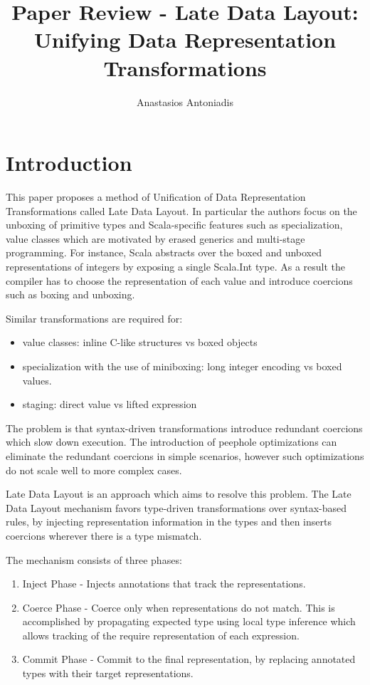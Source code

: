 \documentclass{article} \usepackage{hyperref} \usepackage{graphicx}
\begin{document}
\title{Paper Review - Late Data Layout: Unifying Data Representation Transformations} \author{Anastasios Antoniadis}

\maketitle

\section{Introduction}

This paper proposes a method of Unification of Data Representation
Transformations called Late Data Layout. In particular the authors
focus on the unboxing of primitive types and Scala-specific features
such as specialization, value classes which are motivated by erased
generics and multi-stage programming. For instance, Scala abstracts
over the boxed and unboxed representations of integers by exposing a
single Scala.Int type. As a result the compiler has to choose the
representation of each value and introduce coercions such as boxing
and unboxing.

Similar transformations are required for:
\begin{itemize}
\item value classes: inline C-like structures vs boxed objects
\item specialization with the use of miniboxing: long integer encoding vs
boxed values.
\item staging: direct value vs lifted expression
\end{itemize}
The problem is that syntax-driven transformations introduce redundant
coercions which slow down execution. The introduction of peephole
optimizations can eliminate the redundant coercions in simple
scenarios, however such optimizations do not scale well to more
complex cases.

Late Data Layout is an approach which aims to resolve this
problem. The Late Data Layout mechanism favors type-driven
transformations over syntax-based rules, by injecting representation
information in the types and then inserts coercions wherever there is
a type mismatch.

The mechanism consists of three phases:
\begin{enumerate}
\item Inject Phase - Injects annotations that track the
representations.
\item Coerce Phase - Coerce only when representations do not
match. This is accomplished by propagating expected type using local
type inference which allows tracking of the require representation of
each expression.
\item Commit Phase - Commit to the final representation, by replacing
annotated types with their target representations.
\end{enumerate}
\end{document}
